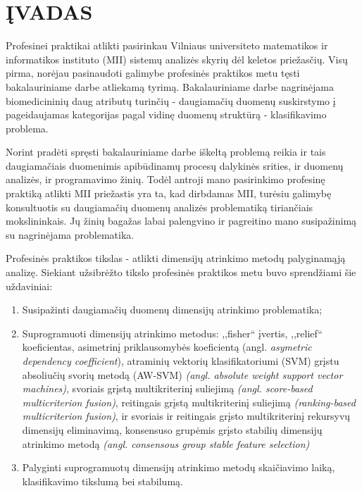\section*{ĮVADAS}

Profesinei praktikai atlikti pasirinkau Vilniaus universiteto matematikos ir 
informatikos instituto (MII) sistemų analizės skyrių dėl keletos priežasčių. Visų pirma, norėjau pasinaudoti 
galimybe profesinės praktikos metu tęsti bakalauriniame darbe atliekamą tyrimą. 
Bakalauriniame darbe nagrinėjama biomedicininių daug atributų turinčių - 
daugiamačių duomenų suskirstymo į pageidaujamas kategorijas pagal vidinę duomenų
struktūrą - klasifikavimo problema.

Norint pradėti spręsti bakalauriniame darbe iškeltą problemą reikia ir tais 
daugiamačiais duomenimis apibūdinamų procesų dalykinės srities, ir duomenų analizės, ir programavimo 
žinių. Todėl antroji mano pasirinkimo profesinę praktiką atlikti MII priežastis yra ta, kad
dirbdamas MII, turėsiu galimybę konsultuotis su daugiamačių 
duomenų analizės problematiką tiriančiais mokslininkais. Jų žinių bagažas
labai palengvino ir pagreitino mano susipažinimą su nagrinėjama problematika.

Profesinės praktikos tikslas - atlikti dimensijų atrinkimo metodų palyginamąją analizę. Siekiant užsibrėžto tikslo profesinės praktikos metu buvo sprendžiami šie 
uždaviniai:
\begin{enumerate}
  \item Susipažinti daugiamačių duomenų dimensijų atrinkimo problematika;
  \item Suprogramuoti dimensijų atrinkimo metodus: 
,,fisher`` įvertis, 
,,relief`` koeficientas,
asimetrinį priklausomybės koeficientą (angl. \textit{asymetric dependency coefficient}),
atraminių vektorių klasifikatoriumi (SVM) grįstu absoliučių svorių metodą (AW-SVM) \textit{(angl. absolute weight support vector machines)},
svoriais grįstą multikriterinį suliejimą \textit{(angl. score-based multicriterion fusion)},
reitingais grįstą multikriterinį suliejimą \textit{(ranking-based multicriterion fusion)},
ir svoriais ir reitingais grįsto multikriterinį rekursyvų dimensijų eliminavimą\cite{5611484},
konsensuso grupėmis grįsto stabilių dimensijų atrinkimo metodą\cite{loscalzo2009consensus} \textit{(angl. consensous group stable feature selection)}
  \item Palyginti suprogramuotų dimensijų atrinkimo metodų skaičiavimo laiką, klasifikavimo tikslumą bei stabilumą.
\end{enumerate}

